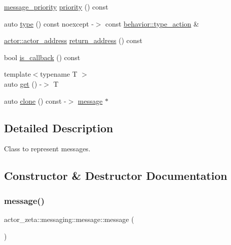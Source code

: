 \begin{DoxyCompactItemize}
\item 
\hyperlink{namespaceactor__zeta_1_1messaging_a1b4c4b3ab625eb033c15da4fbe9c4a89}{message\+\_\+priority} \hyperlink{classactor__zeta_1_1messaging_1_1message_af5f7ce0e94bfae703f84c358cefe80d5}{priority} () const
\item 
auto \hyperlink{classactor__zeta_1_1messaging_1_1message_a5d44fe019c0e2451ed0add86e7403226}{type} () const noexcept -\/$>$ const \hyperlink{classactor__zeta_1_1behavior_1_1type__action}{behavior\+::type\+\_\+action} \&
\item 
\hyperlink{classactor__zeta_1_1actor_1_1actor__address}{actor\+::actor\+\_\+address} \hyperlink{classactor__zeta_1_1messaging_1_1message_af1a8a856212d754964b9ef80d6f70e9e}{return\+\_\+address} () const
\item 
bool \hyperlink{classactor__zeta_1_1messaging_1_1message_a8384e47a23f78c49075edd57797d3791}{is\+\_\+callback} () const
\item 
{\footnotesize template$<$typename T $>$ }\\auto \hyperlink{classactor__zeta_1_1messaging_1_1message_a3e6147856c28d39c3786f1ea8a64213a}{get} () -\/$>$ T
\item 
auto \hyperlink{classactor__zeta_1_1messaging_1_1message_a5206bd7a0def3cb864a3468cee2d37e2}{clone} () const -\/$>$ \hyperlink{classactor__zeta_1_1messaging_1_1message}{message} $\ast$
\end{DoxyCompactItemize}


\subsection{Detailed Description}
Class to represent messages. 

\subsection{Constructor \& Destructor Documentation}
\mbox{\label{classactor__zeta_1_1messaging_1_1message_ad2d5ed4012814ff6e374eab24bb6079d}} 
\subsubsection{\texorpdfstring{message()}{message()}\hspace{0.1cm}{\footnotesize\ttfamily [1/11]}}
{\footnotesize\ttfamily actor\+\_\+zeta\+::messaging\+::message\+::message (\begin{DoxyParamCaption}{ }\end{DoxyParamCaption})\hspace{0.3cm}{\ttfamily [delete]}}


